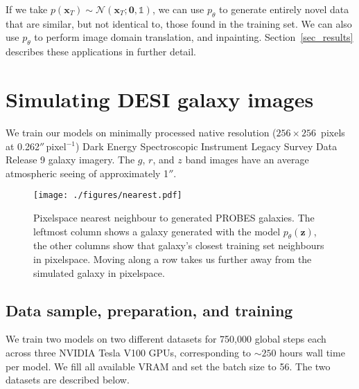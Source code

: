 \documentclass[fleqn,usenatbib]{mnras}
\begin{document}
If we take $p(\mathbf{x}_T) \sim \mathcal{N}(\mathbf{x}_T; \mathbf{0},
\mathds{1})$, we can use $p_\theta$ to generate entirely novel data that are
similar, but not identical to, those found in the training set. We can also use
$p_\theta$ to perform image domain translation, and inpainting.
Section~\ref{sec_results} describes these applications in further detail.

\section{Simulating DESI galaxy images} \label{sec_application}

We train our models on minimally processed native resolution (${256
\times 256}$~pixels at 0.262$''$\,pixel$^{-1}$) Dark Energy Spectroscopic Instrument
\citep[DESI;][]{cite_desi} Legacy Survey Data Release 9 galaxy imagery. The
$g$, $r$, and $z$ band images have an average atmospheric seeing of approximately 1$''$.

\begin{figure}
    \centering
    \texttt{[image: ./figures/nearest.pdf]}
    \caption{Pixelspace nearest neighbour to generated PROBES galaxies. The leftmost
    column shows a galaxy generated with the model $p_\theta(\mathbf{z})$, the other
    columns show that galaxy's closest training set neighbours in pixelspace.
    Moving along a row takes us further away from
    the simulated galaxy in pixelspace.}
    \label{fig_closest}
\end{figure}

\subsection{Data sample, preparation, and training}

We train two models on two different datasets for 750,000 global steps each
across three NVIDIA Tesla V100 GPUs, corresponding to ${\sim}250$ hours wall
time per model. We fill all available VRAM and set the batch size to 56.
The two datasets are described below.
\end{document}
